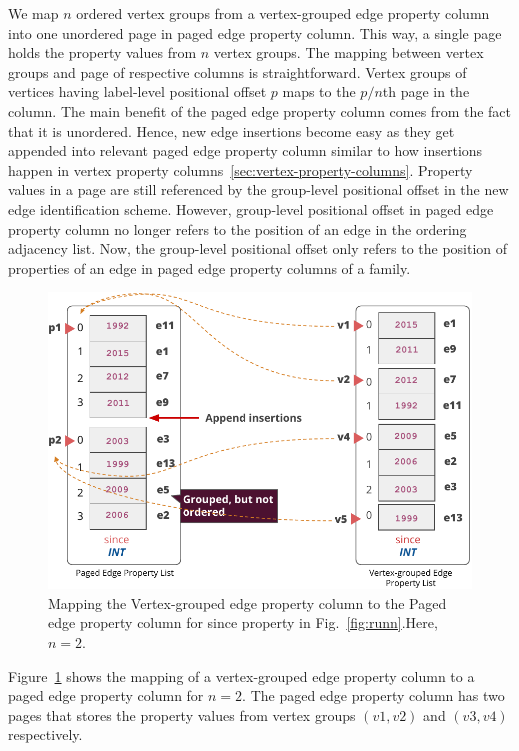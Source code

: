 We map $n$ ordered vertex groups from a vertex-grouped edge property column into one unordered page in paged edge property column. This way, a single page holds the property values from $n$ vertex groups. The mapping between vertex groups and page of respective columns is straightforward. Vertex groups of vertices having label-level positional offset $p$ maps to the $p/n$th page in the column. The main benefit of the paged edge property column comes from the fact that it is unordered. Hence, new edge insertions become easy as they get appended into relevant paged edge property column similar to how insertions happen in vertex property columns~\ref{sec:vertex-property-columns}. Property values in a page are still referenced by the group-level positional offset in the new edge identification scheme. However, group-level positional offset in paged edge property column no longer refers to the position of an edge in the ordering adjacency list. Now, the group-level positional offset only refers to the position of properties of an edge in paged edge property columns of a family. 

\begin{figure}
	\vspace{-40pt}
	\hfill\includegraphics[scale=0.78]{img/paged}\hspace*{\fill}
	\captionsetup{justification=centering}
	\caption{Mapping the Vertex-grouped edge property column to the Paged edge property column for since property in Fig.~\ref{fig:runn}.Here, $n=2$.}
	\label{fig:paged}
	\vspace{-5pt}
\end{figure}

Figure~\ref{fig:paged} shows the mapping of a vertex-grouped edge property column to a paged edge property column for $n=2$. The paged edge property column has two pages that stores the property values from vertex groups $(v1,v2)$ and $(v3,v4)$ respectively.

